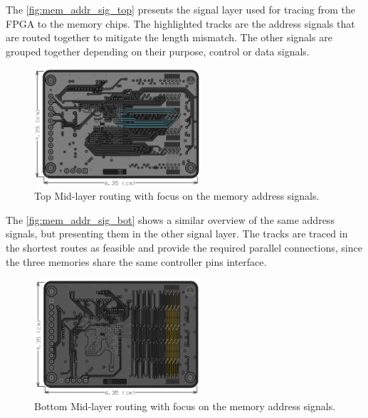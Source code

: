 The \autoref{fig:mem_addr_sig_top} presents the signal layer used for tracing from the FPGA to the memory chips. The highlighted tracks are the address signals that are routed together to mitigate the length mismatch. The other signals are grouped together depending on their purpose, control or data signals.

\begin{figure}[!ht]
    \begin{center}
        \includegraphics[width=0.55\textwidth]{figures/mem_addr_signals.png}
        \caption{Top Mid-layer routing with focus on the memory address signals.}
        \label{fig:mem_addr_sig_top}
    \end{center}
\end{figure}

The \autoref{fig:mem_addr_sig_bot} shows a similar overview of the same address signals, but presenting them in the other signal layer. The tracks are traced in the shortest routes as feasible and provide the required parallel connections, since the three memories share the same controller pins interface. 

\begin{figure}[!ht]
    \begin{center}
        \includegraphics[width=0.55\textwidth]{figures/mem_addr_signals_2.png}
        \caption{Bottom Mid-layer routing with focus on the memory address signals.}
        \label{fig:mem_addr_sig_bot}
    \end{center}
\end{figure}



